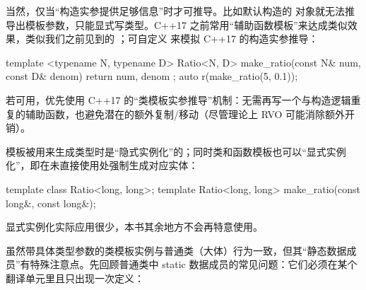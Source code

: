 当然，仅当“构造实参提供足够信息”时才可推导。比如默认构造的  对象就无法推导出模板参数，只能显式写类型。C++17 之前常用“辅助函数模板”来达成类似效果，类似我们之前见到的 ；可自定义  来模拟 C++17 的构造实参推导：

\begin{code}
template <typename N, typename D>
Ratio<N, D> make_ratio(const N& num, const D& denom) {
  return { num, denom };
}
auto r(make_ratio(5, 0.1));
\end{code}

若可用，优先使用 C++17 的“类模板实参推导”机制：无需再写一个与构造逻辑重复的辅助函数，也避免潜在的额外复制/移动（尽管理论上 RVO 可能消除额外开销）。

模板被用来生成类型时是“隐式实例化”的；同时类和函数模板也可以“显式实例化”，即在未直接使用处强制生成对应实体：

\begin{code}
template class Ratio<long, long>;
template Ratio<long, long> make_ratio(const long&,
                                      const long&);
\end{code}

显式实例化实际应用很少，本书其余地方不会再特意使用。

虽然带具体类型参数的类模板实例与普通类（大体）行为一致，但其“静态数据成员”有特殊注意点。先回顾普通类中 static 数据成员的常见问题：它们必须在某个翻译单元里且只出现一次定义：

